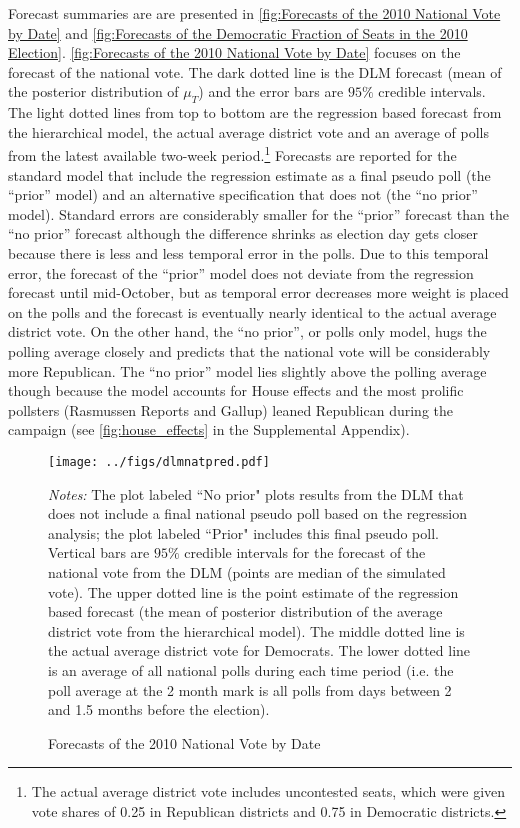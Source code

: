 \documentclass[12pt,final,fleqn]{article}
\theoremstyle{plain}
\begin{document}
Forecast summaries are are presented in \autoref{fig:Forecasts of the 2010 National Vote by Date} and \autoref{fig:Forecasts of the Democratic Fraction of Seats in the 2010 Election}. \autoref{fig:Forecasts of the 2010 National Vote by Date} focuses on the forecast of the national vote. The dark dotted line is the DLM forecast (mean of the posterior distribution of $\mu_T$) and the error bars are $95\%$ credible intervals. The light dotted lines from top to bottom are the regression based forecast from the hierarchical model, the actual average district vote and an average of polls from the latest available two-week period.\footnote{The actual average district vote includes uncontested seats, which were given vote shares of 0.25 in Republican districts and 0.75 in Democratic districts.} Forecasts are reported for the standard model that include the regression estimate as a final pseudo poll (the ``prior'' model) and an alternative specification that does not (the ``no prior'' model). Standard errors are considerably smaller for the ``prior'' forecast than the ``no prior'' forecast although the difference shrinks as election day gets closer because there is less and less temporal error in the polls. Due to this temporal error, the forecast of the ``prior'' model does not deviate from the regression forecast until mid-October, but as temporal error decreases more weight is placed on the polls and the forecast is eventually nearly identical to the actual average district vote. On the other hand, the ``no prior'', or polls only model, hugs the polling average closely and predicts that the national vote will be considerably more Republican. The ``no prior'' model lies slightly above the polling average though because the model accounts for House effects and the most prolific pollsters (Rasmussen Reports and Gallup) leaned Republican during the campaign (see \autoref*{fig:house_effects} in the Supplemental Appendix). 

\begin{figure}[!htb]
\centering
\texttt{[image: ../figs/dlmnatpred.pdf]}
\vspace{.5cm}
\caption{Forecasts of the 2010 National Vote by Date}
\label{fig:Forecasts of the 2010 National Vote by Date}
\begin{minipage}{\linewidth}
\footnotesize
\emph{Notes:} The plot labeled ``No prior" plots results from the DLM that does not include a final national pseudo poll based on the regression analysis; the plot labeled ``Prior" includes this final pseudo poll. Vertical bars are $95\%$ credible intervals for the forecast of the national vote from the DLM (points are median of the simulated vote). The upper dotted line is the point estimate of the regression based forecast (the mean of posterior distribution of the average district vote from the hierarchical model). The middle dotted line is the actual average district vote for Democrats. The lower dotted line is an average of all national polls during each time period (i.e. the poll average at the 2 month mark is all polls from days between 2 and 1.5 months before the election).
\end{minipage}
\end{figure}
\end{document}
